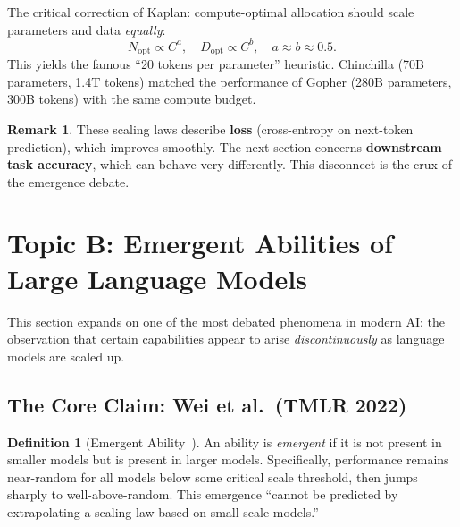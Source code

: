 \documentclass[11pt, a4paper]{article}
\theoremstyle{definition}
\newtheorem{definition}{Definition}[section]
\newtheorem{remark}{Remark}[section]
\theoremstyle{plain}
\begin{document}
The critical correction of Kaplan: compute-optimal allocation should scale parameters and data \emph{equally}:
\begin{equation}
  N_{\mathrm{opt}} \propto C^{a}, \quad D_{\mathrm{opt}} \propto C^{b}, \quad a \approx b \approx 0.5.
\end{equation}
This yields the famous ``20 tokens per parameter'' heuristic. Chinchilla (70B parameters, 1.4T tokens) matched the performance of Gopher (280B parameters, 300B tokens) with the same compute budget.

\begin{remark}
These scaling laws describe \textbf{loss} (cross-entropy on next-token prediction), which improves smoothly. The next section concerns \textbf{downstream task accuracy}, which can behave very differently. This disconnect is the crux of the emergence debate.
\end{remark}


\section{Topic B: Emergent Abilities of Large Language Models}
\label{sec:emergence-topic}

This section expands on one of the most debated phenomena in modern AI: the observation that certain capabilities appear to arise \emph{discontinuously} as language models are scaled up.

\subsection{The Core Claim: Wei et al.\ (TMLR 2022)}
\label{subsec:wei}

\begin{definition}[Emergent Ability~\cite{wei2022emergent}]
An ability is \emph{emergent} if it is not present in smaller models but is present in larger models. Specifically, performance remains near-random for all models below some critical scale threshold, then jumps sharply to well-above-random. This emergence ``cannot be predicted by extrapolating a scaling law based on small-scale models.''
\end{definition}
\end{document}
